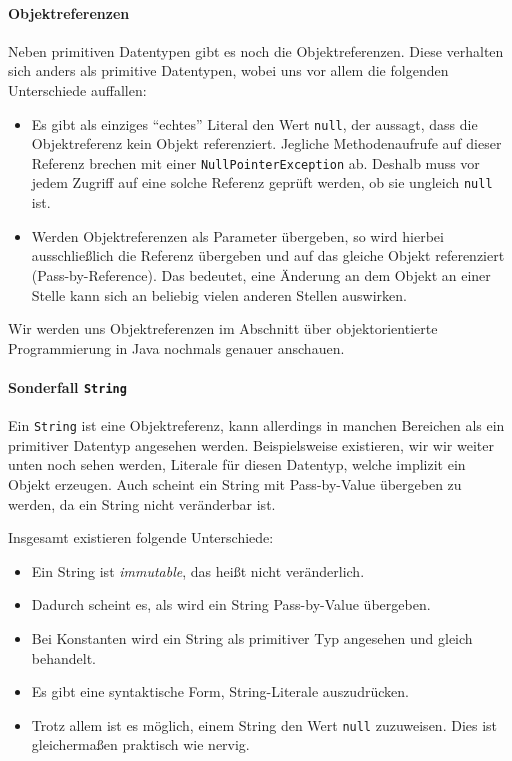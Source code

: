 	\paragraph{Objektreferenzen}
		Neben primitiven Datentypen gibt es noch die Objektreferenzen. Diese verhalten sich anders als primitive Datentypen, wobei uns vor allem die folgenden Unterschiede auffallen:
		\begin{itemize}
			\item Es gibt als einziges \enquote{echtes} Literal den Wert \lstinline|null|, der aussagt, dass die Objektreferenz kein Objekt referenziert. Jegliche Methodenaufrufe auf dieser Referenz brechen mit einer \lstinline|NullPointerException| ab. Deshalb muss vor jedem Zugriff auf eine solche Referenz geprüft werden, ob sie ungleich \lstinline|null| ist.
			\item Werden Objektreferenzen als Parameter übergeben, so wird hierbei ausschließlich die Referenz übergeben und auf das gleiche Objekt referenziert (Pass-by-Reference). Das bedeutet, eine Änderung an dem Objekt an einer Stelle kann sich an beliebig vielen anderen Stellen auswirken.
		\end{itemize}
		Wir werden uns Objektreferenzen im Abschnitt  über objektorientierte Programmierung in Java nochmals genauer anschauen.
	
	\paragraph{Sonderfall \lstinline|String|}
		Ein \lstinline|String| ist eine Objektreferenz, kann allerdings in manchen Bereichen als ein primitiver Datentyp angesehen werden. Beispielsweise existieren, wir wir weiter unten noch sehen werden, Literale für diesen Datentyp, welche implizit ein Objekt erzeugen. Auch scheint ein String mit Pass-by-Value übergeben zu werden, da ein String nicht veränderbar ist.
		
		Insgesamt existieren folgende Unterschiede:
		\begin{itemize}
			\item Ein String ist \textit{immutable}, das heißt nicht veränderlich.
			\item Dadurch scheint es, als wird ein String Pass-by-Value übergeben.
			\item Bei Konstanten wird ein String als primitiver Typ angesehen und gleich behandelt.
			\item Es gibt eine syntaktische Form, String-Literale auszudrücken.
			\item Trotz allem ist es möglich, einem String den Wert \lstinline|null| zuzuweisen. Dies ist gleichermaßen praktisch wie nervig.
		\end{itemize}

